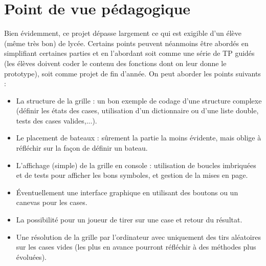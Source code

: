 \chapter{Point de vue pédagogique}

Bien évidemment, ce projet dépasse largement ce qui est exigible d'un élève (même très bon) de lycée. Certains points peuvent néanmoins être abordés en simplifiant certaines parties et en l'abordant soit comme une série de TP guidés (les élèves doivent coder le contenu des fonctions dont on leur donne le prototype), soit comme projet de fin d'année. On peut aborder les points suivants :
\begin{itemize}
\item La structure de la grille : un bon exemple de codage d'une structure complexe (définir les états des cases, utilisation d'un dictionnaire ou d'une liste double, tests des cases valides,...).
\item Le placement de bateaux : sûrement la partie la moins évidente, mais oblige à réfléchir sur la façon de définir un bateau.
\item L'affichage (simple) de la grille en console : utilisation de boucles imbriquées et de tests pour afficher les bons symboles, et gestion de la mises en page.
\item Éventuellement une interface graphique en utilisant des boutons ou un canevas pour les cases.
\item La possibilité pour un joueur de tirer sur une case et retour du résultat.
\item Une résolution de la grille par l'ordinateur avec uniquement des tirs aléatoires sur les cases vides (les plus en avance pourront réfléchir à des méthodes plus évoluées).
\end{itemize}


